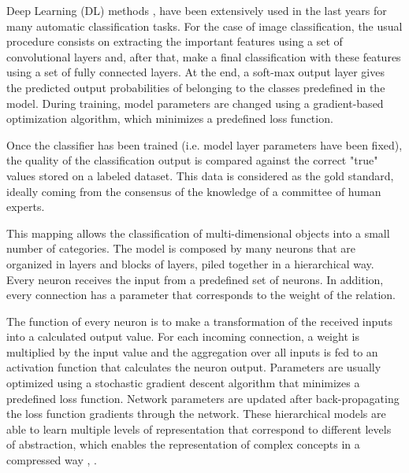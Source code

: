 \documentclass[review]{elsarticle}
\theoremstyle{definition} %
\theoremstyle{remark}
\begin{document}
Deep Learning (DL) methods \cite{nature-deep-learning}, \cite{888} have been extensively used in the last years for many automatic classification tasks. For the case of image classification, the usual procedure consists on extracting the important features using a set of convolutional layers and, after that, make a final classification with these features using a set of fully connected layers. At the end, a soft-max output layer gives the predicted output probabilities of belonging to the classes predefined in the model. During training, model parameters are changed using a gradient-based optimization algorithm, which minimizes a predefined loss function.\cite{Goodfellow-et-al-2016} 

Once the classifier has been trained (i.e. model layer parameters have been fixed), the quality of the classification output is compared against the correct "true" values stored on a labeled dataset. This data is considered as the gold standard, ideally coming from the consensus of the knowledge of a committee of human experts.

This mapping allows the classification of multi-dimensional objects into a small number of categories. The model is composed by many neurons that are organized in layers and blocks of layers, piled together in a hierarchical way. Every neuron receives the input from a predefined set of neurons. In addition, every connection has a parameter that corresponds to the weight of the relation. 

The function of every neuron is to make a transformation of the received inputs into a calculated output value. For each incoming connection, a weight is multiplied by the input value and the aggregation over all inputs is fed to an activation function that calculates the neuron output. Parameters are usually optimized using a stochastic gradient descent algorithm that minimizes a predefined loss function. Network parameters are updated after back-propagating the loss function gradients through the network. These hierarchical models are able to learn multiple levels of representation that correspond to different levels of abstraction, which enables the representation of complex concepts in a compressed way \cite{Bengio:2013:RLR:2498740.2498889}, \cite{bengio-2009}.
\end{document}
